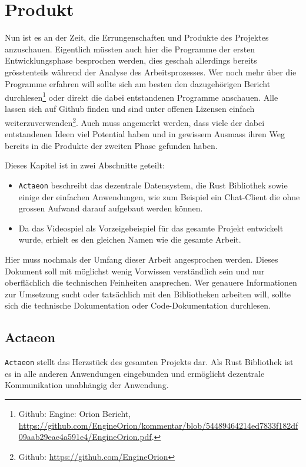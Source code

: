 \documentclass[a4paper,11pt,titlepage,twoside]{memoir}
\begin{document}
\chapter{Produkt}
\label{sec:org2c2421b}
Nun ist es an der Zeit, die Errungenschaften und Produkte des
Projektes anzuschauen. Eigentlich müssten auch hier die Programme der
ersten Entwicklungsphase besprochen werden, dies geschah allerdings
bereits grösstenteils während der Analyse des Arbeitsprozesses. Wer
noch mehr über die Programme erfahren will sollte sich am besten den
dazugehörigen Bericht durchlesen\footnote{Github: Engine: Orion Bericht,
\url{https://github.com/EngineOrion/kommentar/blob/54489464214ed7833f182df09aab29eae4a591e4/EngineOrion.pdf}.} oder direkt die dabei
entstandenen Programme anschauen. Alle lassen sich auf Github finden
und sind unter offenen Lizensen einfach weiterzuverwenden\footnote{Github: \url{https://github.com/EngineOrion}\label{org1464d9b}}. Auch
muss angemerkt werden, dass viele der dabei entstandenen Ideen viel
Potential haben und in gewissem Ausmass ihren Weg bereits in die
Produkte der zweiten Phase gefunden haben.

\noindent Dieses Kapitel ist in zwei Abschnitte geteilt:
\begin{itemize}
\item \texttt{Actaeon} beschreibt das dezentrale Datensystem, die Rust Bibliothek
sowie einige der einfachen Anwendungen, wie zum Beispiel ein
Chat-Client die ohne grossen Aufwand darauf aufgebaut werden können.
\item Da das Videospiel als Vorzeigebeispiel für das gesamte Projekt
entwickelt wurde, erhielt es den gleichen Namen wie die gesamte
Arbeit.
\end{itemize}

\noindent Hier muss nochmals der Umfang dieser Arbeit angesprochen
werden. Dieses Dokument soll mit möglichst wenig Vorwissen
verständlich sein und nur oberflächlich die technischen Feinheiten
ansprechen. Wer genauere Informationen zur Umsetzung sucht oder
tatsächlich mit den Bibliotheken arbeiten will, sollte sich die
technische Dokumentation oder Code-Dokumentation durchlesen.
\section{Actaeon}
\label{sec:orgc33890b}
\texttt{Actaeon} stellt das Herzstück des gesamten Projekts dar. Als Rust
Bibliothek ist es in alle anderen Anwendungen eingebunden und
ermöglicht dezentrale Kommunikation unabhängig der Anwendung.\\
\end{document}
